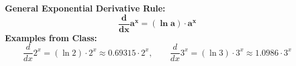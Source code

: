 \documentclass[10.5pt]{article}
\begin{document}
\begin{tcolorbox}[colback=chalkgreen!6, colframe=chalkgreen, boxrule=1pt, arc=3pt, left=8pt, right=8pt, top=5pt, bottom=5pt]
\textbf{\large General Exponential Derivative Rule:}
\[
  \mathbf{\frac{d}{dx} a^x = (\ln a) \cdot a^x}
\]
\textbf{Examples from Class:}
\[
  \frac{d}{dx} 2^x = (\ln 2) \cdot 2^x \approx 0.69315 \cdot 2^x, \qquad \frac{d}{dx} 3^x = (\ln 3) \cdot 3^x \approx 1.0986 \cdot 3^x
\]
\end{tcolorbox}
\end{document}
